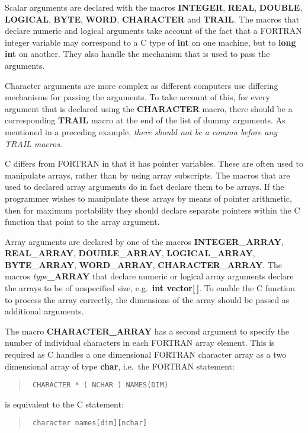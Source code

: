 Scalar arguments are declared with the macros {\bf INTEGER}, {\bf REAL}, {\bf
DOUBLE}, {\bf LOGICAL}, {\bf BYTE}, {\bf WORD}, {\bf CHARACTER} and {\bf TRAIL}.
The macros that declare numeric and logical arguments take account of the fact
that a FORTRAN integer variable may correspond to a C type of {\bf int} on one
machine, but to {\bf long int} on another. They also handle the mechanism that
is used to pass the arguments.

Character arguments are more complex as different computers use differing
mechanisms for passing the arguments. To take account of this, for every
argument that is declared using the {\bf CHARACTER} macro, there should be a
corresponding {\bf TRAIL} macro at the end of the list of dummy arguments. As
mentioned in a preceding example, {\em there should not be a comma before any
TRAIL macros}.

C differs from FORTRAN in that it has pointer variables. These are often used to
manipulate arrays, rather than by using array subscripts. The macros that are
used to declared array arguments do in fact declare them to be arrays. If the
programmer wishes to manipulate these arrays by means of pointer arithmetic,
then for maximum portability they should declare separate pointers within the C
function that point to the array argument.

Array arguments are declared by one of the macros 
{\bf INTEGER\_ARRAY}, {\bf REAL\_ARRAY}, {\bf DOUBLE\_ARRAY}, {\bf
LOGICAL\_ARRAY}, {\bf BYTE\_ARRAY}, {\bf WORD\_ARRAY}, {\bf CHARACTER\_ARRAY}.
The macros {\em type}{\bf\_ARRAY} that declare numeric or
logical array arguments declare the arrays to be of unspecified size, e.g.\
{\bf int vector[\,]}. To enable the C function to process the array correctly,
the dimensions of the array should be passed as additional arguments.

The macro {\bf CHARACTER\_ARRAY} has a second argument to specify the number of
individual characters in each FORTRAN array element. This is required as C
handles a one dimensional FORTRAN character array as a two dimensional array of
type {\bf char}, i.e.\ the FORTRAN statement:

\begin{quote}{\tt
CHARACTER * ( NCHAR ) NAMES(DIM)
}
\end{quote}

is equivalent to the C statement:

\begin{quote}{\tt
character names[dim][nchar]
}
\end{quote}

